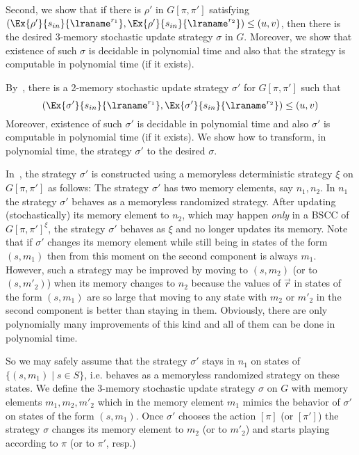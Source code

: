 \noindent
Second, we show that if there is $\rho'$ in $G[\pi,\pi']$ satisfying 
$(\Ex{\rho'}{s_{in}}{\lraname^{r_1}}, \Ex{\rho'}{s_{in}}{\lraname^{r_2}}) \leq (u,v)$, then
there is the desired 3-memory stochastic update strategy $\sigma$ in $G$. Moreover, we show that existence of such $\sigma$ is decidable in polynomial time and also that the strategy is computable in polynomial time (if it exists).

By~\cite{BBCFK:MDP-two-views}, there is a 2-memory stochastic update strategy $\sigma'$ for $G[\pi,\pi']$ such that 
\[(\Ex{\sigma'}{s_{in}}{\lraname^{r_1}}, \Ex{\sigma'}{s_{in}}{\lraname^{r_2}})\leq (u,v)\]
Moreover, existence of such $\sigma'$ is decidable in polynomial time and also $\sigma'$ is computable in polynomial time (if it exists). We show how to transform, in polynomial time, the strategy $\sigma'$ to the desired $\sigma$.

In~\cite{BBCFK:MDP-two-views}, the strategy $\sigma'$ is constructed using a memoryless deterministic strategy $\xi$ on $G[\pi,\pi']$ as follows: The strategy $\sigma'$ has two memory elements, say $n_1,n_2$. In $n_1$ the strategy $\sigma'$ behaves as a memoryless randomized strategy. After updating (stochastically) its memory element to $n_2$, which may happen {\em only} in a BSCC of $G[\pi,\pi']^{\xi}$, the strategy $\sigma'$ behaves as $\xi$ and no longer updates its memory. 
Note that if $\sigma'$ changes its memory element while still being in states of the form $(s,m_1)$ then from this moment on the second component is always $m_1$. However, such a strategy may be improved by moving to $(s,m_2)$ (or to $(s,m'_2)$) when its memory changes to $n_2$ because the values of $\vec{r}$ in states of the form $(s,m_1)$ are so large that moving to any state with $m_2$ or $m'_2$ in the second component is better than staying in them. Obviously, there are only polynomially many improvements of this kind and all of them can be done in polynomial time.

So we may safely assume that the strategy $\sigma'$ stays in $n_1$ on states of $\{(s,m_1)\mid s\in S\}$, i.e. behaves as a memoryless randomized strategy on these states. We define the 3-memory stochastic update strategy $\sigma$ on $G$ with memory elements $m_1,m_2,m'_2$  which in the memory element $m_1$ mimics the behavior of $\sigma'$ on states of the form $(s,m_1)$. Once $\sigma'$ chooses the action $[\pi]$ (or $[\pi']$) the strategy $\sigma$ changes its memory element to $m_2$ (or to $m'_2$) and starts playing according to $\pi$ (or to $\pi'$, resp.)
 

